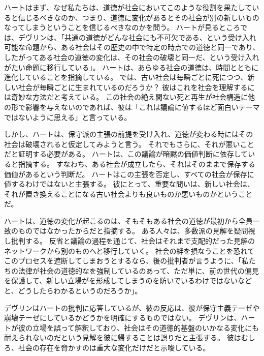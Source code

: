 \documentclass[paper=a4,book,openany]{jlreq}
\newcommand{\ig}[1]{}           %
\begin{document}
ハートはまず、なぜ私たちは、道徳が社会においてこのような役割を果たしていると信じるべきなのか、つまり、道徳に変化があるとその社会が別の新しいものなってしまうということを信じるべきなのかを問う。
ハートが見るところでは、デヴリン\ig{Patrick Devlin}は、「共通の道徳がどんな社会にも不可欠である、という受け入れ可能な命題から、ある社会はその歴史の中で特定の時点での道徳と同一であり、したがってある社会の道徳の変化は、その社会の破壊と同一だ、という受け入れがたい命題に移行している」\citep[p. 51--52]{hart63:_law_liber_and_moral}。
ハートは、あらゆる社会の道徳は、時間とともに進化していることを指摘している。
では、古い社会は毎瞬ごとに死につつ、新しい社会が毎瞬ごとに生まれているのだろうか？ 彼はこれを社会を理解するには奇妙な方法だと考えている。
この社会の絶え間ない死と再生が社会構造に他の形で影響を与えないのであれば、彼は「これは議論に値するほど面白いテーマではないように思える」と言っている\citep[p.3]{hart63:_law_liber_and_moral}。

しかし、ハートは、保守派の主張の前提を受け入れ、道徳が変わる時にはその社会は破壊されると仮定してみようと言う。
それでもさらに、それが悪いことだと証明する必要がある。
ハートは、この議論が暗黙の価値判断に依存していると指摘する。
すなわち、ある社会が成立したら、それはそのままで保存する価値があるという判断だ。
ハートはこの主張を否定し、すべての社会が保存に値するわけではないと主張する。
彼にとって、重要な問いは、新しい社会は、それが置き換えることになる古い社会よりも良いものか悪いものかということだ。

ハートは、道徳の変化が起こるのは、そもそもある社会の道徳が最初から全員一致のものではなかったからだと指摘する。
ある人々は、多数派の見解を疑問視し批判する。
反省と議論の過程を通じて、社会はそれまで支配的だった見解のネットワークから別のものへと移行していく。
社会の絆を損なうことを恐れてこのプロセスを遮断してしまおうとするなら、後の批判者が言うように、「私たちの法律が社会の道徳的なを強制しているのあって、ただ単に、前の世代の偏見を保護して、新しい立場がを形成してしまうのを防いでいるわけではないなどと、どうしたらわかるというのだろうか」\citep[p.169]{bix00:_juris}。

デヴリン\ig{Patrick Devlin}はハートの批判に応答しているが、彼の反応は、彼が保守主義テーゼや崩壊テーゼにしているかどうかを明確にするものではない。
デヴリン\ig{Patrick Devlin}は、ハートが彼の立場を誤って解釈しており、社会はその道徳的基盤のいかなる変化にも耐えられないのだという見解を彼に帰することは誤りだと主張する。
彼はむしろ、社会の存在を脅かすのは重大な変化だけだと示唆している。
\end{document}
